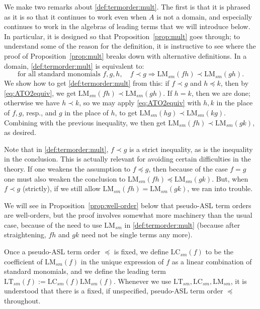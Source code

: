 \documentclass[11pt,reqno]{amsart}
\newcommand{\lmsm}{\text{LM}_{sm}}
\newcommand{\lcsm}{\text{LC}_{sm}}
\newcommand{\ltsm}{\text{LT}_{sm}}
\theoremstyle{definition}
\numberwithin{equation}{section}
\begin{document}
\begin{remark}
\label{rem:ato-2-equivalent}
We make two remarks about \ref{def:termorder:mult}. The first is that it is phrased as it is so that it continues to work even when $A$ is not a domain, and especially continues to work in the algebras of leading terms that we will introduce below. In particular, it is designed so that Proposition~\ref{prop:mult} goes through; to understand some of the reason for the definition, it is instructive to see where the proof of Proposition~\ref{prop:mult} breaks down with alternative definitions. In a domain, \ref{def:termorder:mult} is equivalent to: 
\begin{equation} \label{eq:ATO2equiv}
\text{for all standard monomials } f,g,h, \quad f \prec g \Rightarrow \lmsm(fh) \prec \lmsm(gh). 
\end{equation}
We show how to get \ref{def:termorder:mult} from this: if $f \prec g$ and $h \preceq k$, then by \eqref{eq:ATO2equiv}, we get $\lmsm(fh) \prec \lmsm(gh)$. If $h=k$, then we are done; otherwise we have $h \prec k$, so we may apply \eqref{eq:ATO2equiv} with $h,k$ in the place of $f,g$, resp., and $g$ in the place of $h$, to get $\lmsm(hg) \prec \lmsm(kg)$. Combining with the previous inequality, we then get $\lmsm(fh) \prec \lmsm(gk)$, as desired. 

Note that in \ref{def:termorder:mult}, $f \prec g$ is a strict inequality, as is the inequality in the conclusion. This is actually relevant for avoiding certain difficulties in the theory. If one weakens the assumption to $f \preceq g$, then because of the case $f=g$ one must also weaken the conclusion to $\lmsm(fh) \preceq \lmsm(gk)$. But, when $f \prec g$ (strictly), if we still allow $\lmsm(fh) = \lmsm(gk)$, we ran into trouble.
\end{remark}

We will see in Proposition~\ref{prop:well-order} below that pseudo-ASL term orders are well-orders, but the proof involves somewhat more machinery than the usual case, because of the need to use $\lmsm$ in \ref{def:termorder:mult} (because after straightening, $fh$ and $gk$ need not be single terms any more).

Once a pseudo-ASL term order $\preceq$ is fixed, we define $\lcsm(f)$ to be the coefficient of $\lmsm(f)$ in the unique expression of $f$ as a linear combination of standard monomials, and we define the leading term $\ltsm(f) := \lcsm(f) \lmsm(f)$. Whenever we use $\ltsm, \lcsm, \lmsm$, it is understood that there is a fixed, if unspecified, pseudo-ASL term order $\preceq$ throughout.
\end{document}
